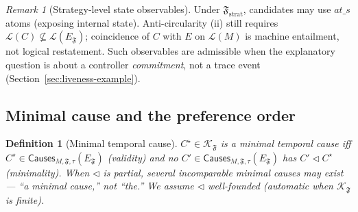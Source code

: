 \documentclass[11pt]{article}
\newtheorem{definition}{Definition}
\theoremstyle{remark}
\newtheorem{remark}{Remark}
\newcommand{\Lang}{\mathcal{L}}
\newcommand{\Frame}{\mathfrak{F}}
\begin{document}
\begin{remark}[Strategy-level state observables]
\label{rem:strat-obs}
Under \(\Frame_{\mathrm{strat}}\), candidates may use \(\mathit{at\_}s\) atoms
(exposing internal state). Anti-circularity (ii) still requires
\(\Lang(C)\not\subseteq\Lang(E_{\Frame})\); coincidence of \(C\) with \(E\) on
\(\Lang(M)\) is machine entailment, not logical restatement. Such observables are
admissible when the explanatory question is about a controller \emph{commitment},
not a trace event (Section~\ref{sec:liveness-example}).
\end{remark}

\subsection{Minimal cause and the preference order}

\begin{definition}[Minimal temporal cause]
\label{def:mincause}
\(C^\star\in\mathcal{K}_{\Frame}\) is a minimal temporal cause iff
\(C^\star\in\mathsf{Causes}_{M,\Frame,\tau}(E_{\Frame})\) (validity) and no
\(C'\in\mathsf{Causes}_{M,\Frame,\tau}(E_{\Frame})\) has \(C'\triangleleft C^\star\)
(minimality). When \(\triangleleft\) is partial, several incomparable minimal
causes may exist --- ``\emph{a} minimal cause,'' not ``the.'' We assume
\(\triangleleft\) well-founded (automatic when \(\mathcal{K}_{\Frame}\) is finite).
\end{definition}
\end{document}
